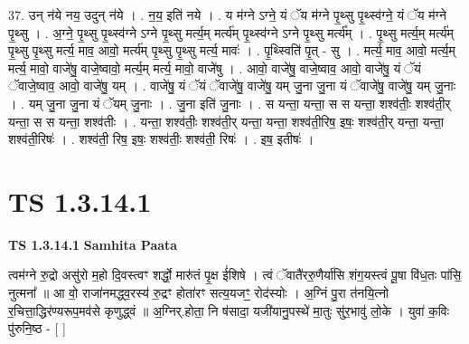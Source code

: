 \documentclass[17pt]{extarticle}
\begin{document}
37. उन् न॑ये नय॒ उदुन् न॑ये । . न॒य॒ इति॑ नये । . य म॑ग्ने ऽग्ने॒ यं ॅय म॑ग्ने पृ॒थ्सु पृ॒थ्स्व॑ग्ने॒ यं ॅय म॑ग्ने पृ॒थ्सु । . अ॒ग्ने॒ पृ॒थ्सु पृ॒थ्स्व॑ग्ने ऽग्ने पृ॒थ्सु मर्त्य॒म् मर्त्य॑म् पृ॒थ्स्व॑ग्ने ऽग्ने पृ॒थ्सु मर्त्य᳚म् । . पृ॒थ्सु मर्त्य॒म् मर्त्य॑म् पृ॒थ्सु पृ॒थ्सु मर्त्य॒ माव॒ आवो॒ मर्त्य॑म् पृ॒थ्सु पृ॒थ्सु मर्त्य॒ मावः॑ । . पृ॒थ्स्विति॑ पृ॒त् - सु । . मर्त्य॒ माव॒ आवो॒ मर्त्य॒म् मर्त्य॒ मावो॒ वाजे॑षु॒ वाजे॒ष्वावो॒ मर्त्य॒म् मर्त्य॒ मावो॒ वाजे॑षु । . आवो॒ वाजे॑षु॒ वाजे॒ष्वाव॒ आवो॒ वाजे॑षु॒ यं ॅयं ॅवाजे॒ष्वाव॒ आवो॒ वाजे॑षु॒ यम् । . वाजे॑षु॒ यं ॅयं ॅवाजे॑षु॒ वाजे॑षु॒ यम् जु॒ना जु॒ना यं ॅवाजे॑षु॒ वाजे॑षु॒ यम् जु॒नाः । . यम् जु॒ना जु॒ना यं ॅयम् जु॒नाः । . जु॒ना इति॑ जु॒नाः । . स यन्ता॒ यन्ता॒ स स यन्ता॒ शश्व॑तीः॒ शश्व॑ती॒र् यन्ता॒ स स यन्ता॒ शश्व॑तीः । . यन्ता॒ शश्व॑तीः॒ शश्व॑ती॒र् यन्ता॒ यन्ता॒ शश्व॑ती॒रिष॒ इषः॒ शश्व॑ती॒र् यन्ता॒ यन्ता॒ शश्व॑ती॒रिषः॑ । . शश्व॑ती॒ रिष॒ इषः॒ शश्व॑तीः॒ शश्व॑ती॒ रिषः॑ । . इष॒ इतीषः॑ । \newline
\pagebreak
{}

\section{ TS 1.3.14.1 }

\textbf{TS 1.3.14.1 } \newline
\textbf{Samhita Paata} \newline

त्वम॑ग्ने रु॒द्रो असु॑रो म॒हो दि॒वस्त्वꣳ शर्द्धो॒ मारु॑तं पृ॒क्ष ई॑शिषे । त्वं ॅवातै॑ररु॒णैर्या॑सि शंग॒यस्त्वं पू॒षा वि॑ध॒तः पा॑सि॒ नुत्मना᳚ ॥ आ वो॒ राजा॑नमद्ध्व॒रस्य॑ रु॒द्रꣳ होता॑रꣳ सत्य॒यजꣳ॒॒ रोद॑स्योः । अ॒ग्निं पु॒रा त॑नयि॒त्नो र॒चित्ता॒द्धिर॑ण्यरूप॒मव॑से कृणुद्ध्वं ॥ अ॒ग्निर्.होता॒ नि ष॑सादा॒ यजी॑यानु॒पस्थे॑ मा॒तुः सु॑र॒भावु॑ लो॒के । युवा॑ क॒विः पु॑रुनि॒ष्ठ - [ ] \newline
\end{document}
